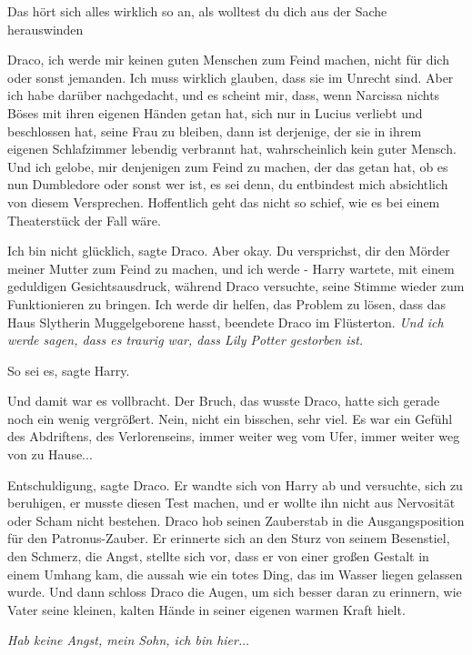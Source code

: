 \glqq Das hört sich alles wirklich so an, als wolltest du dich aus der Sache
herauswinden\grqq{}

\glqq Draco, ich werde mir keinen guten Menschen zum Feind machen, nicht für
dich oder sonst jemanden. Ich muss wirklich glauben, dass sie im Unrecht sind.
Aber ich habe darüber nachgedacht, und es scheint mir, dass, wenn Narcissa
nichts Böses mit ihren eigenen Händen getan hat, sich nur in Lucius verliebt und
beschlossen hat, seine Frau zu bleiben, dann ist derjenige, der sie in ihrem
eigenen Schlafzimmer lebendig verbrannt hat, wahrscheinlich kein guter Mensch.
Und ich gelobe, mir denjenigen zum Feind zu machen, der das getan hat, ob es nun
Dumbledore oder sonst wer ist, es sei denn, du entbindest mich absichtlich von
diesem Versprechen. Hoffentlich geht das nicht so schief, wie es bei einem
Theaterstück der Fall wäre.\grqq{}

\glqq Ich bin nicht glücklich\grqq{}, sagte Draco. \glqq Aber okay. Du
versprichst, dir den Mörder meiner Mutter zum Feind zu machen, und ich werde
-\grqq{} Harry wartete, mit einem geduldigen Gesichtsausdruck, während Draco
versuchte, seine Stimme wieder zum Funktionieren zu bringen. \glqq Ich werde dir
helfen, das Problem zu lösen, dass das Haus Slytherin Muggelgeborene
hasst\grqq{}, beendete Draco im Flüsterton. \glqq \emph{Und ich werde sagen,
dass es traurig war, dass Lily Potter gestorben ist.}\grqq{}

\glqq So sei es\grqq{}, sagte Harry.

Und damit war es vollbracht. Der Bruch, das wusste Draco, hatte sich gerade noch
ein wenig vergrößert. Nein, nicht ein bisschen, sehr viel. Es war ein Gefühl des
Abdriftens, des Verlorenseins, immer weiter weg vom Ufer, immer weiter weg von
zu Hause...

\glqq Entschuldigung\grqq{}, sagte Draco. Er wandte sich von Harry ab und
versuchte, sich zu beruhigen, er musste diesen Test machen, und er wollte ihn
nicht aus Nervosität oder Scham nicht bestehen. Draco hob seinen Zauberstab in
die Ausgangsposition für den Patronus-Zauber. Er erinnerte sich an den Sturz von
seinem Besenstiel, den Schmerz, die Angst, stellte sich vor, dass er von einer
großen Gestalt in einem Umhang kam, die aussah wie ein totes Ding, das im Wasser
liegen gelassen wurde. Und dann schloss Draco die Augen, um sich besser daran zu
erinnern, wie Vater seine kleinen, kalten Hände in seiner eigenen warmen Kraft
hielt.

\emph{Hab keine Angst, mein Sohn, ich bin hier.}..


